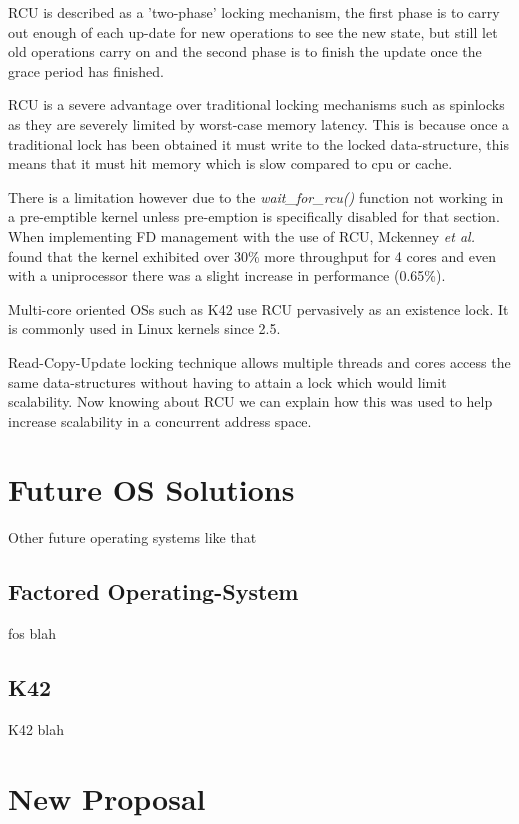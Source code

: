 \documentclass[journal]{IEEEtran}
\begin{document}
RCU is described as a 'two-phase' locking mechanism, the first phase is to carry out enough of each up-date for new operations to see the new state, but still let old operations carry on and the second phase is to finish the update once the grace period has finished.

RCU is a severe advantage over traditional locking mechanisms such as spinlocks as they are severely limited by worst-case memory latency. This is because once a traditional lock has been obtained it must write to the locked data-structure, this means that it must hit memory which is slow compared to cpu or cache.

There is a limitation however due to the \emph{wait\_for\_rcu()} function not working in a pre-emptible kernel unless pre-emption is specifically disabled for that section.
When implementing FD management with the use of RCU, Mckenney \emph{et al.} \cite{RCU} found that the kernel exhibited over 30\% more throughput for 4 cores and even with a uniprocessor there was a slight increase in performance (0.65\%).

Multi-core oriented OSs such as K42 use RCU pervasively as an existence lock. It is commonly used in Linux kernels since 2.5.

Read-Copy-Update locking technique allows multiple threads and cores access the same data-structures without having to attain a lock which would limit scalability. Now knowing about RCU we can explain how this was used to help increase scalability in a concurrent address space.

\section{Future OS Solutions}

Other future operating systems like that

\subsection{Factored Operating-System}
fos blah

\subsection{K42}
K42 blah

\section{New Proposal}
\end{document}

